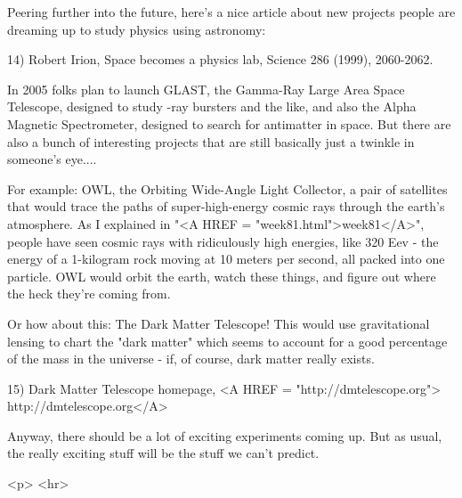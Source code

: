Peering further into the future, here's a nice article about new
projects people are dreaming up to study physics using astronomy:

14) Robert Irion, Space becomes a physics lab, Science 286 (1999),
2060-2062.

In 2005 folks plan to launch GLAST, the Gamma-Ray Large Area Space 
Telescope, designed to study \gamma -ray bursters and the like, and
also the Alpha Magnetic Spectrometer, designed to search for 
antimatter in space.   But there are also a bunch of interesting
projects that are still basically just a twinkle in someone's eye....

For example: OWL, the Orbiting Wide-Angle Light Collector, a
pair of satellites that would trace the paths of super-high-energy 
cosmic rays through the earth's atmosphere.  As I explained in
"<A HREF = "week81.html">week81</A>", people have seen 
cosmic rays with ridiculously high
energies, like 320 Eev - the energy of a 1-kilogram rock moving
at 10 meters per second, all packed into one particle.  OWL would
orbit the earth, watch these things, and figure out where the
heck they're coming from.    

Or how about this: The Dark Matter Telescope!  This would use 
gravitational lensing to chart the "dark matter" which seems 
to account
for a good percentage of the mass in the universe - if, of course, dark
matter really exists.

15) Dark Matter Telescope homepage, <A HREF = "http://dmtelescope.org">
http://dmtelescope.org</A>

Anyway, there should be a lot of exciting experiments coming up.  But
as usual, the really exciting stuff will be the stuff we can't predict.




<p> <hr>



